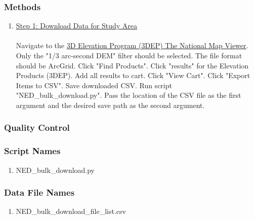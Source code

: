 \subsubsection*{Methods}
\begin{enumerate}
\item  \underline{Step 1: Download Data for Study Area}\\\\
Navigate to the \href{https://viewer.nationalmap.gov/basic/?basemap=b1\&category=ned,nedsrc\&title=3DEP\%20View}{3D Elevation Program (3DEP) The National Map Viewer}. Only the "1/3 arc-second DEM" filter should be selected. The file format should be ArcGrid. Click "Find Products". Click "results" for the Elevation Products (3DEP). Add all results to cart. Click "View Cart". Click "Export Items to CSV". Save downloaded CSV. Run script "NED\_bulk\_download.py". Pass the location of the CSV file as the first argument and the desired save path as the second argument.
\end{enumerate}
\subsubsection*{Quality Control}
\subsubsection*{Script Names}
\begin{enumerate}
\item NED\_bulk\_download.py
\end{enumerate}
\subsubsection*{Data File Names}
\begin{enumerate}
\item NED\_bulk\_download\_file\_list.csv
\end{enumerate}